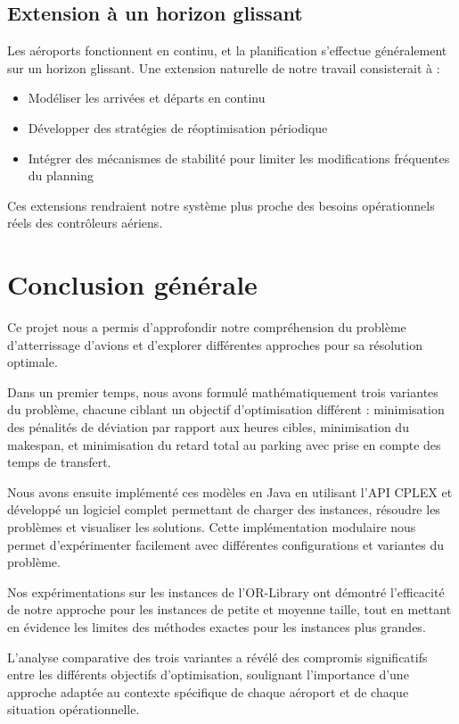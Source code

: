 \documentclass[a4paper,12pt]{report}
\begin{document}
\subsection{Extension à un horizon glissant}
Les aéroports fonctionnent en continu, et la planification s'effectue généralement sur un horizon glissant. Une extension naturelle de notre travail consisterait à :

\begin{itemize}
  \item Modéliser les arrivées et départs en continu
  \item Développer des stratégies de réoptimisation périodique
  \item Intégrer des mécanismes de stabilité pour limiter les modifications fréquentes du planning
\end{itemize}

Ces extensions rendraient notre système plus proche des besoins opérationnels réels des contrôleurs aériens.

\section{Conclusion générale}
Ce projet nous a permis d'approfondir notre compréhension du problème d'atterrissage d'avions et d'explorer différentes approches pour sa résolution optimale.

Dans un premier temps, nous avons formulé mathématiquement trois variantes du problème, chacune ciblant un objectif d'optimisation différent : minimisation des pénalités de déviation par rapport aux heures cibles, minimisation du makespan, et minimisation du retard total au parking avec prise en compte des temps de transfert.

Nous avons ensuite implémenté ces modèles en Java en utilisant l'API CPLEX et développé un logiciel complet permettant de charger des instances, résoudre les problèmes et visualiser les solutions. Cette implémentation modulaire nous permet d'expérimenter facilement avec différentes configurations et variantes du problème.

Nos expérimentations sur les instances de l'OR-Library ont démontré l'efficacité de notre approche pour les instances de petite et moyenne taille, tout en mettant en évidence les limites des méthodes exactes pour les instances plus grandes.

L'analyse comparative des trois variantes a révélé des compromis significatifs entre les différents objectifs d'optimisation, soulignant l'importance d'une approche adaptée au contexte spécifique de chaque aéroport et de chaque situation opérationnelle.
\end{document}
